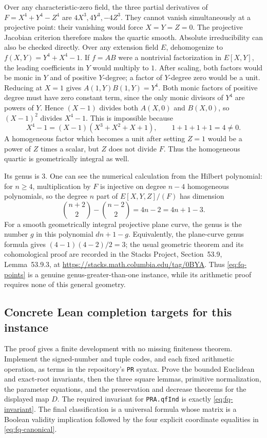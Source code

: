Over any characteristic-zero field, the three partial derivatives of
$F=X^4+Y^4-Z^4$ are $4X^3,4Y^3,-4Z^3$.  They cannot vanish
simultaneously at a projective point: their vanishing would force
$X=Y=Z=0$.  The projective Jacobian criterion therefore makes the
quartic smooth.  Absolute irreducibility can also be checked directly.
Over any extension field $E$, dehomogenize to
$f(X,Y)=Y^4+X^4-1$.  If $f=A B$ were a nontrivial factorization in
$E[X,Y]$, the leading coefficients in $Y$ would multiply to $1$.
After scaling, both factors would be monic in $Y$ and of positive
$Y$-degree; a factor of $Y$-degree zero would be a unit.
Reducing at $X=1$ gives $A(1,Y)B(1,Y)=Y^4$.  Both monic factors
of positive degree must have zero constant term, since the only
monic divisors of $Y^4$ are powers of $Y$.  Hence $(X-1)$ divides
both $A(X,0)$ and $B(X,0)$, so $(X-1)^2$ divides $X^4-1$.
This is impossible because
\[
 X^4-1=(X-1)(X^3+X^2+X+1),
 \qquad 1+1+1+1=4\ne0.
\]
A homogeneous factor which becomes a unit after setting $Z=1$
would be a power of $Z$ times a scalar, but $Z$ does not divide $F$.
Thus the homogeneous quartic is geometrically integral as well.

Its genus is $3$.  One can see the numerical calculation from the
Hilbert polynomial: for $n\geq4$, multiplication by $F$ is injective
on degree $n-4$ homogeneous polynomials, so the degree $n$ part of
$E[X,Y,Z]/(F)$ has dimension
\[
 \binom{n+2}{2}-\binom{n-2}{2}=4n-2=4n+1-3.
\]
For a smooth geometrically integral projective plane curve, the genus
is the number $g$ in this polynomial $dn+1-g$.  Equivalently, the
plane-curve genus formula gives $(4-1)(4-2)/2=3$; the usual geometric
theorem and its cohomological proof are recorded in the Stacks Project,
Section~53.9, Lemma~53.9.3, at
\url{https://stacks.math.columbia.edu/tag/0BYA}.
Thus \eqref{eq:fq-points} is a genuine genus-greater-than-one instance,
while its arithmetic proof requires none of this general geometry.

\subsection{Concrete Lean completion targets for this instance}

The proof gives a finite development with no missing finiteness theorem.
Implement the signed-number and tuple codes, and each fixed arithmetic
operation, as terms in the repository's \texttt{PR} syntax.  Prove
the bounded Euclidean and exact-root invariants, then the three
square lemmas, primitive normalization, the parameter equations,
and the preservation and decrease theorems for the displayed map $D$.
The required invariant for \texttt{PRA.qfInd} is exactly
\eqref{eq:fq-invariant}.  The final classification is a universal
formula whose matrix is a Boolean validity implication followed by
the four explicit coordinate equalities in \eqref{eq:fq-canonical}.

